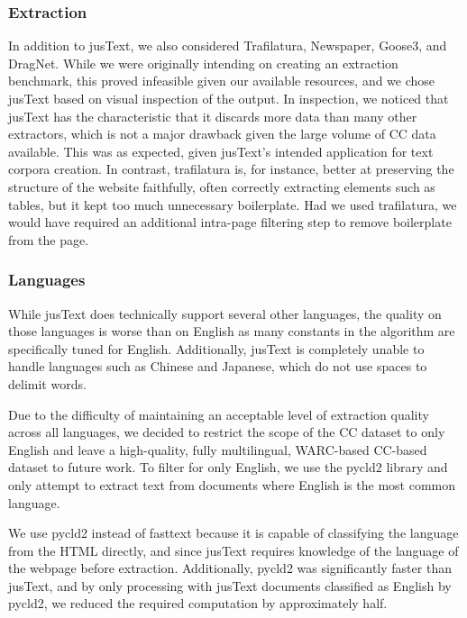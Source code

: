 \documentclass[11pt,a4paper]{article}
\begin{document}
\begin{appendices}
\subsubsection{Extraction}

In addition to jusText, we also considered Trafilatura, Newspaper, Goose3, and DragNet. While we were originally intending on creating an extraction benchmark, this proved infeasible given our available resources, and we chose jusText based on visual inspection of the output. In inspection, we noticed that jusText has the characteristic that it discards more data than many other extractors, which is not a major drawback given the large volume of CC data available. This was as expected, given jusText's intended application for text corpora creation. In contrast, trafilatura is, for instance, better at preserving the structure of the website faithfully, often correctly extracting elements such as tables, but it kept too much unnecessary boilerplate. Had we used trafilatura, we would have required an additional intra-page filtering step to remove boilerplate from the page.

\subsubsection{Languages}

While jusText does technically support several other languages, the quality on those languages is worse than on English as many constants in the algorithm are specifically tuned for English. Additionally, jusText is completely unable to handle languages such as Chinese and Japanese, which do not use spaces to delimit words.

Due to the difficulty of maintaining an acceptable level of extraction quality across all languages, we decided to restrict the scope of the CC dataset to only English and leave a high-quality, fully multilingual, WARC-based CC-based dataset to future work. To filter for only English, we use the pycld2 library and only attempt to extract text from documents where English is the most common language. 

We use pycld2 instead of fasttext because it is capable of classifying the language from the HTML directly, and since jusText requires knowledge of the language of the webpage before extraction. Additionally, pycld2 was significantly faster than jusText, and by only processing with jusText documents classified as English by pycld2, we reduced the required computation by approximately half.


\end{appendices}
\end{document}
